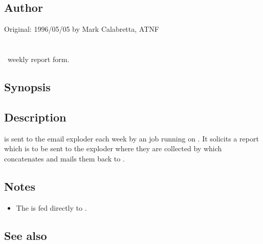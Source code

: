 \subsection*{Author}
 
Original: 1996/05/05 by Mark Calabretta, ATNF


\newpage
\section{}
\label{report_form}

\aipspp\ weekly report form.

\subsection*{Synopsis}
 
\begin{synopsis}
\end{synopsis}
 
\subsection*{Description}

 is sent to the \mbox{} email
exploder each week by an   job running on
.  It solicits a report which is to be sent to the
\mbox{} exploder where they are collected by 
which concatenates and mails them back to \mbox{}.

\subsection*{Notes}
 
\begin{itemize}
\item
   The  is fed directly to .
\end{itemize}

\subsection*{See also}
 
